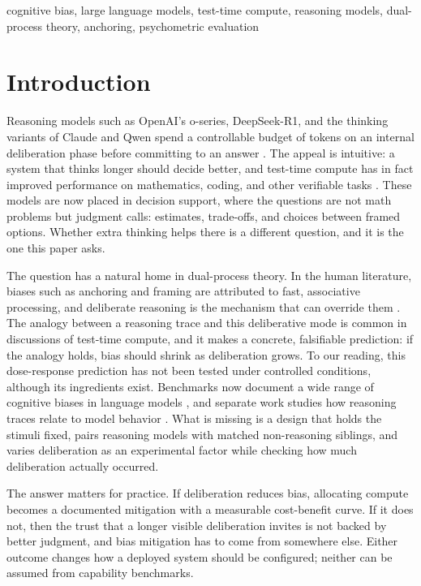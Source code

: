 \documentclass[conference]{IEEEtran}
\begin{document}
\begin{IEEEkeywords}
cognitive bias, large language models, test-time compute, reasoning models, dual-process theory, anchoring, psychometric evaluation
\end{IEEEkeywords}

\section{Introduction}

Reasoning models such as OpenAI's o-series, DeepSeek-R1, and the thinking variants of Claude and Qwen spend a controllable budget of tokens on an internal deliberation phase before committing to an answer \cite{jaech2024openai, guo2025deepseek, yang2025qwen3}. The appeal is intuitive: a system that thinks longer should decide better, and test-time compute has in fact improved performance on mathematics, coding, and other verifiable tasks \cite{snell2024scaling, muennighoff2025s1}. These models are now placed in decision support, where the questions are not math problems but judgment calls: estimates, trade-offs, and choices between framed options. Whether extra thinking helps there is a different question, and it is the one this paper asks.

The question has a natural home in dual-process theory. In the human literature, biases such as anchoring and framing are attributed to fast, associative processing, and deliberate reasoning is the mechanism that can override them \cite{tversky1974judgment, evans2013dual}. The analogy between a reasoning trace and this deliberative mode is common in discussions of test-time compute, and it makes a concrete, falsifiable prediction: if the analogy holds, bias should shrink as deliberation grows. To our reading, this dose-response prediction has not been tested under controlled conditions, although its ingredients exist. Benchmarks now document a wide range of cognitive biases in language models \cite{malberg2024comprehensive, echterhoff2024cognitive, binz2023using, knipper2025bias}, and separate work studies how reasoning traces relate to model behavior \cite{turpin2023language, chen2025reasoning}. What is missing is a design that holds the stimuli fixed, pairs reasoning models with matched non-reasoning siblings, and varies deliberation as an experimental factor while checking how much deliberation actually occurred.

The answer matters for practice. If deliberation reduces bias, allocating compute becomes a documented mitigation with a measurable cost-benefit curve. If it does not, then the trust that a longer visible deliberation invites is not backed by better judgment, and bias mitigation has to come from somewhere else. Either outcome changes how a deployed system should be configured; neither can be assumed from capability benchmarks.
\end{document}
